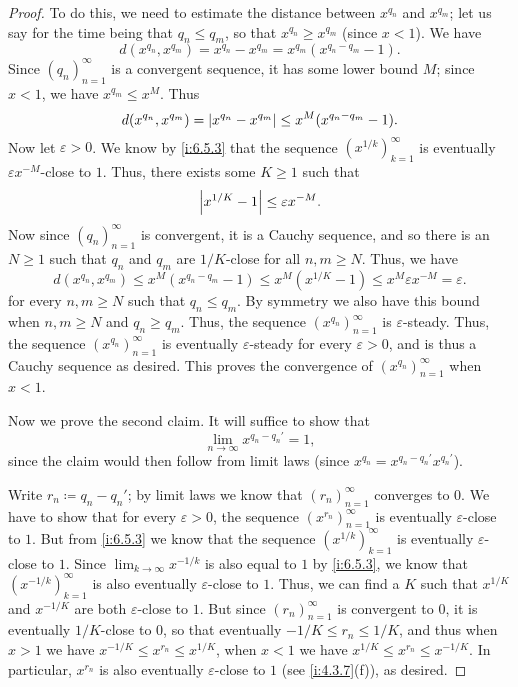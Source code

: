 \begin{proof}
  To do this, we need to estimate the distance between \(x^{q_n}\) and \(x^{q_m}\);
  let us say for the time being that \(q_n \leq q_m\), so that \(x^{q_n} \geq x^{q_m}\) (since \(x < 1\)).
  We have
  \[
    d(x^{q_n}, x^{q_m}) = x^{q_n} - x^{q_m} = x^{q_m} (x^{q_n - q_m} - 1).
  \]
  Since \((q_n)_{n = 1}^\infty\) is a convergent sequence, it has some lower bound \(M\);
  since \(x < 1\), we have \(x^{q_m} \leq x^M\).
  Thus
  \[
    d(x^{q_n}, x^{q_m}) = \left\lvert x^{q_n} - x^{q_m}\right\rvert \leq x^M (x^{q_n - q_m} - 1).
  \]
  Now let \(\varepsilon > 0\).
  We know by \cref{i:6.5.3} that the sequence \((x^{1 / k})_{k = 1}^\infty\) is eventually \(\varepsilon x^{-M}\)-close to \(1\).
  Thus, there exists some \(K \geq 1\) such that
  \[
    \left\lvert x^{1 / K} - 1\right\rvert \leq \varepsilon x^{-M}.
  \]
  Now since \((q_n)_{n = 1}^\infty\) is convergent, it is a Cauchy sequence, and so there is an \(N \geq 1\) such that \(q_n\) and \(q_m\) are \(1 / K\)-close for all \(n, m \geq N\).
  Thus, we have
  \[
    d(x^{q_n}, x^{q_m}) \leq x^M (x^{q_n - q_m} - 1) \leq x^M (x^{1 / K} - 1) \leq x^M \varepsilon x^{-M} = \varepsilon.
  \]
  for every \(n, m \geq N\) such that \(q_n \leq q_m\).
  By symmetry we also have this bound when \(n, m \geq N\) and \(q_n \geq q_m\).
  Thus, the sequence \((x^{q_n})_{n = 1}^\infty\) is \(\varepsilon\)-steady.
  Thus, the sequence \((x^{q_n})_{n = 1}^\infty\) is eventually \(\varepsilon\)-steady for every \(\varepsilon > 0\), and is thus a Cauchy sequence as desired.
  This proves the convergence of \((x^{q_n})_{n = 1}^\infty\) when \(x < 1\).

  Now we prove the second claim.
  It will suffice to show that
  \[
    \lim_{n \to \infty} x^{q_n - q_n'} = 1,
  \]
  since the claim would then follow from limit laws
  (since \(x^{q_n} = x^{q_n - q_n'} x^{q_n'}\)).

  Write \(r_n \coloneqq q_n - q_n'\);
  by limit laws we know that \((r_n)_{n = 1}^\infty\) converges to \(0\).
  We have to show that for every \(\varepsilon > 0\), the sequence \((x^{r_n})_{n = 1}^\infty\) is eventually \(\varepsilon\)-close to \(1\).
  But from \cref{i:6.5.3} we know that the sequence \((x^{1 / k})_{k = 1}^\infty\) is eventually \(\varepsilon\)-close to \(1\).
  Since \(\lim_{k \to \infty} x^{-1 / k}\) is also equal to \(1\) by \cref{i:6.5.3}, we know that \((x^{-1 / k})_{k = 1}^\infty\) is also eventually \(\varepsilon\)-close to \(1\).
  Thus, we can find a \(K\) such that \(x^{1 / K}\) and \(x^{-1 / K}\) are both \(\varepsilon\)-close to \(1\).
  But since \((r_n)_{n = 1}^\infty\) is convergent to \(0\), it is eventually \(1 / K\)-close to \(0\), so that eventually \(-1 / K \leq r_n \leq 1 / K\), and thus when \(x > 1\) we have \(x^{-1 / K} \leq x^{r_n} \leq x^{1 / K}\), when \(x < 1\) we have \(x^{1 / K} \leq x^{r_n} \leq x^{-1 / K}\).
  In particular, \(x^{r_n}\) is also eventually \(\varepsilon\)-close to \(1\) (see \cref{i:4.3.7}(f)), as desired.
\end{proof}

